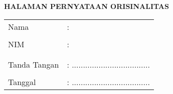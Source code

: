 \clearpage
{}%

\begin{center}
	\smallskip
	
	\large \bfseries \MakeUppercase{Halaman Pernyataan Orisinalitas} \linebreak
	
	\normalsize {}
	\vspace{3cm}
	
	\centering 
	\begin{tabular}{l l}
		Nama 			& : \theauthor \\
		& \\
		NIM 			& : \printnim \\
		& \\
		\\
		Tanda Tangan 	& : ................................... \\
		& \\
		Tanggal 		& : ................................... \\
	\end{tabular}
	
\end{center}
\clearpage
